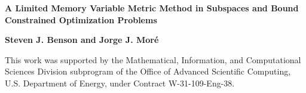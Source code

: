 \documentclass[11pt]{article}
\begin{document}
\setlength{\baselineskip}{15pt}


\begin{center}

{\large \bf A Limited Memory Variable Metric Method in Subspaces and 
Bound Constrained Optimization Problems\footnotemark}


{\bf Steven J. Benson  and
Jorge J. Mor\'e}

\end{center}




\footnotetext
{ This work was supported by the Mathematical, Information, and
Computational Sciences Division subprogram of the Office of Advanced
Scientific Computing, U.S. Department of Energy, under Contract
W-31-109-Eng-38.}

\begin{abstract}

We describe an algorithm for solving nonlinear optimization problems
with lower and upper bounds that constrain the variables.  The algorithm
uses projected gradients to construct a limited memory BFGS matrix
and determine a step direction.  The algorithm has been implemented
and distributed as part of the Toolkit for Advanced Optimization (TAO).
We include numerical results demonstrate is effectiveness 
on a set of large test problems and
its scalability to multiple processors.

\end{abstract}





%



%
\end{document}
